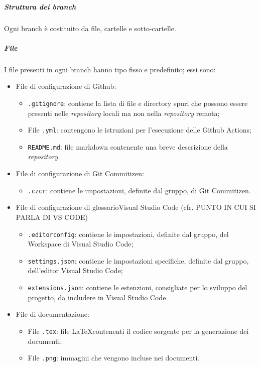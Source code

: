 \documentclass[../norme-di-progetto.tex]{subfiles}
\begin{document}
\subparagraph{Struttura dei branch}
Ogni branch è costituito da file, cartelle e sotto-cartelle.
\subparagraph*{File}
I file presenti in ogni branch hanno tipo fisso e predefinito; essi sono:
\begin{itemize}
  \item File di configurazione di Github:
  \begin{itemize}
    \item \texttt{.gitignore}: contiene la lista di file e directory spuri che possono essere presenti nelle \textit{repository} locali ma non nella \textit{repository} remota;
    \item File \texttt{.yml}: contengono le istruzioni per l'esecuzione delle Github Actions;
    \item \texttt{README.md}: file markdown contenente una breve descrizione della \textit{repository}.
  \end{itemize}
  \item File di configurazione di Git Commitizen:
  \begin{itemize}
    \item \texttt{.czcr}: contiene le impostazioni, definite dal gruppo, di Git Commitizen.
  \end{itemize}
  \item File di configurazione di glossario{Visual Studio Code} (cfr. PUNTO IN CUI SI PARLA DI VS CODE)
  \begin{itemize}
    \item \texttt{.editorconfig}: contiene le impostazioni, definite dal gruppo, del Workspace di Visual Studio Code;
    \item \texttt{settings.json}: contiene le impostazioni specifiche, definite dal gruppo, dell'editor Visual Studio Code;
    \item \texttt{extensions.json}: contiene le estenzioni, consigliate per lo sviluppo del progetto, da includere in Visual Studio Code.
  \end{itemize}
  \item File di documentazione:
  \begin{itemize}
    \item File \texttt{.tex}: file \LaTeX contenenti il codice sorgente per la generazione dei documenti;
    \item File \texttt{.png}: immagini che vengono incluse nei documenti.
  \end{itemize}
\end{itemize}
\end{document}
